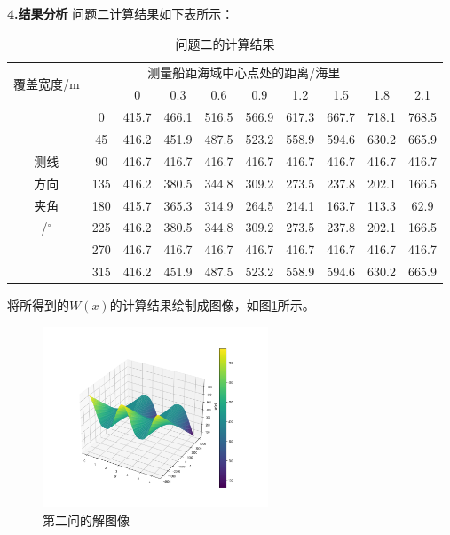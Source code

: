 \documentclass[withoutpreface,bwprint]{cumcmthesis} %
\begin{document}
    \textbf{4.结果分析}
    问题二计算结果如下表所示：
    \begin{table}[htbp]
        \caption{问题二的计算结果}
        \centering
        \begin{tabular}{cc|cccccccc}
            \toprule[2pt]
            \multirow{2}{*}{覆盖宽度/m} & \multicolumn{8}{c}{测量船距海域中心点处的距离/海里}  \\
            \cmidrule(lr){3-10}
             & & 0 & 0.3 & 0.6 & 0.9 & 1.2 & 1.5 & 1.8 & 2.1 \\
            \midrule[1pt]
             & 0 & 415.7 & 466.1 & 516.5 & 566.9 & 617.3 & 667.7 & 718.1 & 768.5 \\
             & 45 & 416.2 & 451.9 & 487.5 & 523.2 & 558.9 & 594.6 & 630.2 & 665.9 \\
            测线 & 90 & 416.7 & 416.7 & 416.7 & 416.7 & 416.7 & 416.7 & 416.7 & 416.7 \\
            方向 & 135 & 416.2 & 380.5 & 344.8 & 309.2 & 273.5 & 237.8 & 202.1 & 166.5 \\
            夹角 & 180 & 415.7 & 365.3 & 314.9 & 264.5 & 214.1 & 163.7 & 113.3 & 62.9\\
            /$^\circ$ & 225 & 416.2 & 380.5 & 344.8 & 309.2 & 273.5 & 237.8 & 202.1 & 166.5 \\
             & 270 & 416.7 & 416.7 & 416.7 & 416.7 & 416.7 & 416.7 & 416.7 & 416.7 \\
             & 315 & 416.2 & 451.9 & 487.5 & 523.2 & 558.9 & 594.6 & 630.2 & 665.9 \\
            \bottomrule[2pt]
        \end{tabular}
    \end{table}
    
    将所得到的$W(x)$的计算结果绘制成图像，如图\ref{15}所示。
    
    \begin{figure}[htbp]
        \centering
        \includegraphics[width=0.6\textwidth]{第二问4.png}
        \caption{第二问的解图像}
        \label{15}
    \end{figure}
    
\end{document}
